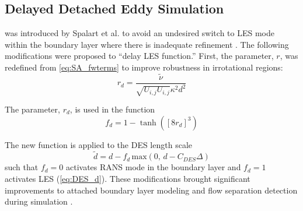 \subsection{Delayed Detached Eddy Simulation} 

 was introduced by Spalart et al. to avoid an undesired switch to LES mode within the boundary layer where there is inadequate refinement \cite{Spalart2006}. The following modifications were proposed to \enquote{delay LES function.} First, the parameter, $r$, was redefined from \cref{eq:SA_fwterms} to improve robustness in irrotational regions:
%
\begin{equation}\label{eq:rd}
    r_d = \frac{\tilde{\nu}}{\sqrt{U_{i,j}U_{i,j}}\kappa^2d^2}
\end{equation}

The parameter, $r_d$, is used in the function
%
\begin{equation}\label{eq:fd}
    f_d = 1 - \tanh([8r_d]^3)
\end{equation}

The new function is applied to the DES length scale
%
\begin{equation}\label{eq:d_tilde}
    \tilde{d} = d - f_d\, \textrm{max}(0,\, d - C_{DES}\Delta)
\end{equation}
%
such that $f_d = 0$ activates RANS mode in the boundary layer and $f_d = 1$ activates LES (\cref{eq:DES_d}). These modifications brought significant improvements to attached boundary layer modeling and flow separation detection during simulation \cite{Spalart2006}.









